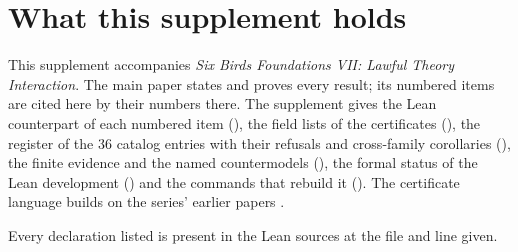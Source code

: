 \section{What this supplement holds}
\label{supp:about}

This supplement accompanies \emph{Six Birds Foundations VII: Lawful Theory Interaction}.
The main paper states and proves every result; its numbered items are cited here by their
numbers there. The supplement gives the Lean counterpart of each numbered item
(), the field lists of the certificates (), the
register of the 36 catalog entries with their refusals and cross-family corollaries
(), the finite evidence and the named countermodels
(), the formal status of the Lean development () and
the commands that rebuild it (). The certificate language builds on the
series' earlier papers \citep{STsiokosFoundationsI,STsiokosFoundationsII,STsiokosFoundationsIII,
STsiokosFoundationsIV,STsiokosFoundationsV,STsiokosFoundationsVI}.

Every declaration listed is present in the Lean sources at the file and line given.
